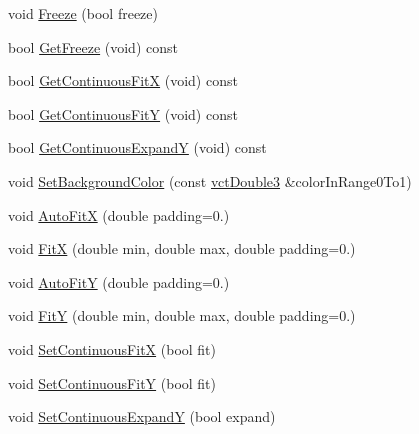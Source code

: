 \begin{DoxyCompactItemize}
\item 
void \hyperlink{classvct_plot2_d_base_afb5501f6c0d7af0d059a6dccb323f744}{Freeze} (bool freeze)
\item 
bool \hyperlink{classvct_plot2_d_base_a138e78a2bdf6dff6fb555a283665399f}{Get\-Freeze} (void) const 
\item 
bool \hyperlink{classvct_plot2_d_base_a4a7fdde81c3dc143b9c0e67462803b76}{Get\-Continuous\-Fit\-X} (void) const 
\item 
bool \hyperlink{classvct_plot2_d_base_a1146a1876ed4173be9fcfc78b27c43e0}{Get\-Continuous\-Fit\-Y} (void) const 
\item 
bool \hyperlink{classvct_plot2_d_base_ac21178c8e2bb5fc56200dd7ec317ec3f}{Get\-Continuous\-Expand\-Y} (void) const 
\item 
void \hyperlink{classvct_plot2_d_base_af262d44ee5bdf00ce6df30dcec4de7ba}{Set\-Background\-Color} (const \hyperlink{vct_fixed_size_vector_types_8h_a4a89122c9d7f72c3f31fe8126e17c3af}{vct\-Double3} \&color\-In\-Range0\-To1)
\end{DoxyCompactItemize}
{\bf }\par
\begin{DoxyCompactItemize}
\item 
void \hyperlink{classvct_plot2_d_base_a9c500da34e1f93757c2105856bf41832}{Auto\-Fit\-X} (double padding=0.)
\item 
void \hyperlink{classvct_plot2_d_base_ab60d6ea3958deace31cd666e27e4b4bd}{Fit\-X} (double min, double max, double padding=0.)
\item 
void \hyperlink{classvct_plot2_d_base_aa2a186f9b941b1ebcb67e6ba860c926e}{Auto\-Fit\-Y} (double padding=0.)
\item 
void \hyperlink{classvct_plot2_d_base_af8adacad97c6a7cfc901cc67e5f3cb83}{Fit\-Y} (double min, double max, double padding=0.)
\end{DoxyCompactItemize}

{\bf }\par
\begin{DoxyCompactItemize}
\item 
void \hyperlink{classvct_plot2_d_base_ac9521c8a97281f64c2e8d31cd9aea224}{Set\-Continuous\-Fit\-X} (bool fit)
\item 
void \hyperlink{classvct_plot2_d_base_aed048c9688484c5b7b94b4960018810d}{Set\-Continuous\-Fit\-Y} (bool fit)
\item 
void \hyperlink{classvct_plot2_d_base_aa1607f7cd083d1410f7cb6f113993b84}{Set\-Continuous\-Expand\-Y} (bool expand)
\end{DoxyCompactItemize}

